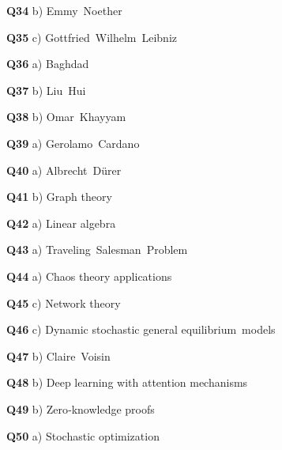 \textbf{Q34} b) Emmy Noether\par
\textbf{Q35} c) Gottfried Wilhelm Leibniz\par
\textbf{Q36} a) Baghdad\par
\textbf{Q37} b) Liu Hui\par
\textbf{Q38} b) Omar Khayyam\par
\textbf{Q39} a) Gerolamo Cardano\par
\textbf{Q40} a) Albrecht Dürer\par
\textbf{Q41} b) Graph theory\par
\textbf{Q42} a) Linear algebra\par
\textbf{Q43} a) Traveling Salesman Problem\par
\textbf{Q44} a) Chaos theory applications\par
\textbf{Q45} c) Network theory\par
\textbf{Q46} c) Dynamic stochastic general equilibrium models\par
\textbf{Q47} b) Claire Voisin\par
\textbf{Q48} b) Deep learning with attention mechanisms\par
\textbf{Q49} b) Zero‑knowledge proofs\par
\textbf{Q50} a) Stochastic optimization\par